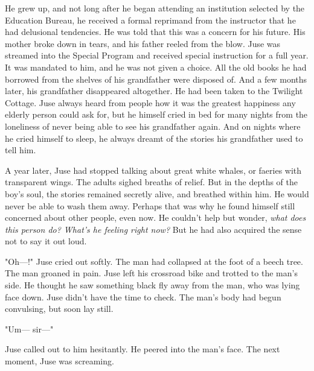 He grew up, and not long after he began attending an institution
selected by the Education Bureau, he received a formal reprimand from
the instructor that he had delusional tendencies. He was told that this
was a concern for his future. His mother broke down in tears, and his
father reeled from the blow. Juse was streamed into the Special Program
and received special instruction for a full year. It was mandated to
him, and he was not given a choice. All the old books he had borrowed
from the shelves of his grandfather were disposed of. And a few months
later, his grandfather disappeared altogether. He had been taken to the
Twilight Cottage. Juse always heard from people how it was the greatest
happiness any elderly person could ask for, but he himself cried in bed
for many nights from the loneliness of never being able to see his
grandfather again. And on nights where he cried himself to sleep, he
always dreamt of the stories his grandfather used to tell him.

A year later, Juse had stopped talking about great white whales, or
faeries with transparent wings. The adults sighed breaths of relief. But
in the depths of the boy's soul, the stories remained secretly alive,
and breathed within him. He would never be able to wash them away.
Perhaps that was why he found himself still concerned about other
people, even now. He couldn't help but wonder, \emph{what does this person do?
What's he feeling right now?} But he had also acquired the sense not to
say it out loud.

"Oh---!" Juse cried out softly. The man had collapsed at the foot of a
beech tree. The man groaned in pain. Juse left his crossroad bike and
trotted to the man's side. He thought he saw something black fly away
from the man, who was lying face down. Juse didn't have the time to
check. The man's body had begun convulsing, but soon lay still.

"Um--- sir---"

Juse called out to him hesitantly. He peered into the man's face. The
next moment, Juse was screaming.